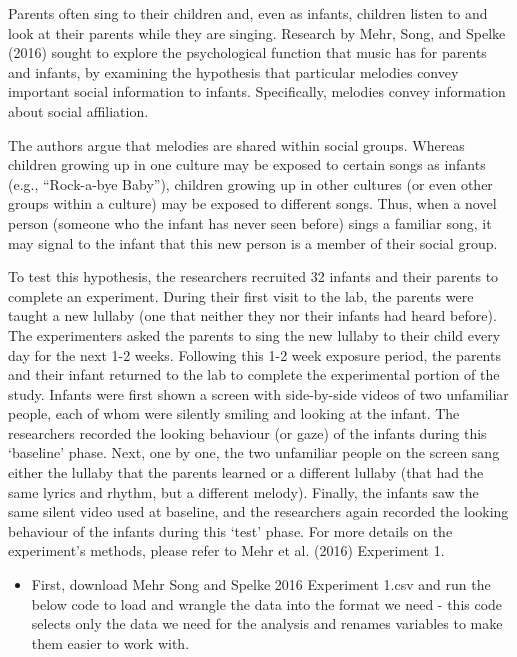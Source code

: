 \documentclass[]{book}
\providecommand{\tightlist}{%
  \setlength{\itemsep}{0pt}\setlength{\parskip}{0pt}}
\begin{document}
Parents often sing to their children and, even as infants, children listen to and look at their parents while they are singing. Research by Mehr, Song, and Spelke (2016) sought to explore the psychological function that music has for parents and infants, by examining the hypothesis that particular melodies convey
important social information to infants. Specifically, melodies convey information about social affiliation.

The authors argue that melodies are shared within social groups. Whereas children growing up in one culture may be exposed to certain songs as infants (e.g., ``Rock-a-bye Baby''), children growing up in other cultures (or even other groups within a culture) may be exposed to different songs. Thus, when a novel person (someone who the infant has never seen before) sings a familiar song, it may signal to the infant that this new person is a member of their social group.

To test this hypothesis, the researchers recruited 32 infants and their parents to complete an experiment. During their first visit to the lab, the parents were taught a new lullaby (one that neither they nor their infants had heard before). The experimenters asked the parents to sing the new lullaby to their child every day for the next 1-2 weeks. Following this 1-2 week exposure period, the parents and their infant returned to the lab to complete the experimental portion of the study. Infants were first shown a screen with side-by-side videos of two unfamiliar people, each of whom were silently smiling and looking at the infant. The researchers recorded the looking behaviour (or gaze) of the infants during this `baseline' phase. Next, one by one, the two unfamiliar people on the screen sang either the lullaby that the parents learned or a different lullaby (that had the same lyrics and rhythm, but a different melody). Finally, the infants saw the same silent video used at baseline, and the researchers again recorded the looking behaviour of the infants during this `test' phase. For more details on the experiment's methods, please refer to Mehr et al. (2016) Experiment 1.

\begin{itemize}
\tightlist
\item
  First, download Mehr Song and Spelke 2016 Experiment 1.csv and run the below code to load and wrangle the data into the format we need - this code selects only the data we need for the analysis and renames variables to make them easier to work with.
\end{itemize}
\end{document}
